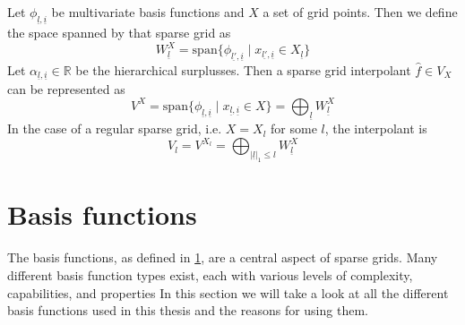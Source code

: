 \documentclass[
  a4paper,  %
  twoside,  %
  bibliography=totoc,
  headsepline,
  cleardoublepage=empty,
  parskip=half,
  draft=false
]{scrbook}
\begin{document}
\begin{definition}
Let $\phi_{\underline{l},\underline{i}}$ be multivariate basis functions and $X$ a set of grid points.
Then we define the space spanned by that sparse grid as
\begin{equation}
W_{\underline{l}}^X=\text{span} \{\phi_{\underline{l'},\underline{i}} \mid x_{\underline{l'},\underline{i}} \in X_{\underline{l}}\}
\end{equation}
Let $\alpha_{\underline{l},\underline{i}} \in \mathds{R}$ be the hierarchical surplusses.
Then a sparse grid interpolant $\hat{f} \in V_X$ can be represented as
\begin{equation}
V^X=\text{span} \{\phi_{\underline{l},\underline{i}} \mid x_{\underline{l},\underline{i}} \in X\}=\bigoplus_{\underline{l}} W^X_{\underline{l}}
\end{equation}
In the case of a regular sparse grid, i.e. $X=X_{l}$ for some $l$, the interpolant is
\begin{equation}
V_l=V^{X_l}=\bigoplus_{|\underline{l}|_1 \leq l} W^X_{\underline{l}}
\end{equation}
\end{definition}

\section{Basis functions}

The basis functions, as defined in \ref{}, are a central aspect of sparse grids.
Many different basis function types exist, each with various levels of complexity, capabilities, and properties
In this section we will take a look at all the different basis functions used in this thesis and the reasons for using them.
\end{document}
